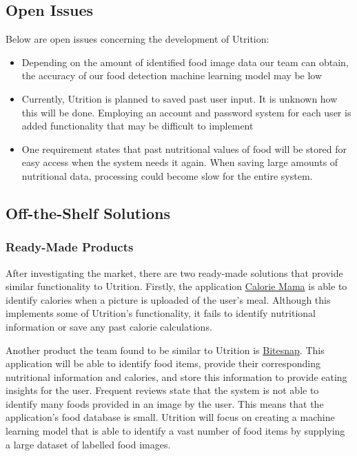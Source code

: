 \documentclass[12pt]{article}
\begin{document}
\subsection{Open Issues}
Below are open issues concerning the development of Utrition:
\begin{itemize}
	\item Depending on the amount of identified food image data our team can obtain, the accuracy of our food detection machine learning model may be low
	\item Currently, Utrition is planned to saved past user input. It is unknown how this will be done. Employing an account and password system for each user is added functionality that may be difficult to implement 
	\item One requirement states that past nutritional values of food will be stored for easy access when the system needs it again. When saving large amounts of nutritional data, processing could become slow for the entire system.
\end{itemize}

\subsection{Off-the-Shelf Solutions}
\subsubsection{Ready-Made Products}
After investigating the market, there are two ready-made solutions that provide similar functionality to Utrition. Firstly, the application \href{https://www.caloriemama.ai/#Categories}{Calorie Mama} is able to identify calories when a picture is uploaded of the user's meal. Although this implements some of Utrition's functionality, it fails to identify nutritional information or save any past calorie calculations.

Another product the team found to be similar to Utrition is \href{https://play.google.com/store/apps/details?id=ai.bite.biteapp&hl=en_US&gl=US}{Bitesnap}. This application will be able to identify food items, provide their corresponding nutritional information and calories, and store this information to provide eating insights for the user. Frequent reviews state that the system is not able to identify many foods provided in an image by the user. This means that the application's food database is small. Utrition will focus on creating a machine learning model that is able to identify a vast number of food items by supplying a large dataset of labelled food images. 
\end{document}
